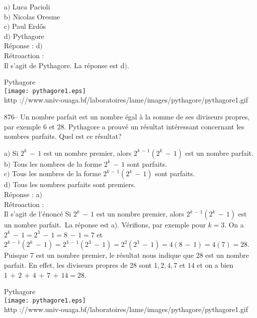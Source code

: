 ﻿\documentclass[letterpaper, 12pt]{article}
\begin{document}
a$)$ Luca Pacioli \\
b$)$ Nicolas Oresme \\
c$)$ Paul Erd\H{o}s \\
d$)$ Pythagore \\

R\'eponse : d$)$\\

R\'etroaction : \\
Il s'agit de Pythagore. La r\'eponse est d$)$.\\

        \begin{center}
        Pythagore\\
    \texttt{[image: pythagore1.eps]}\\
        {\footnotesize http
://www.univ-ouaga.bf/laboratoires/lame/images/pythagore/pythagore1.gif}
    \end{center}

876-- Un nombre parfait est un nombre \'egal \`a la somme de ses
diviseurs propres, par exemple 6 et 28. Pythagore a prouv\'e un
r\'esultat int\'eressant concernant les nombres parfaits. Quel est
ce r\'esultat?

a$)$ Si $2^k\,-\,1$ est un nombre premier, alors $2^{k\,-\,1}(2^k\,-\,1)$
est un nombre parfait. \\
b$)$ Tous les nombres de la forme $2^k\,-\,1$ sont parfaits. \\
c$)$ Tous les nombres de la forme $2^{k\,-\,1}(2^k\,-\,1)$ sont parfaits. \\
d$)$ Tous les nombres parfaits sont premiers.\\

R\'eponse : a$)$\\

R\'etroaction : \\
Il s'agit de l'\'enonc\'e \og Si $2^k\,-\,1$ est un nombre premier,
alors $2^{k\,-\,1}(2^k\,-\,1)$ est un nombre parfait.\fg\ La
r\'eponse est a). V\'erifions, par exemple pour $k=3$. On a
$2^k\,-\,1=2^3\,-\,1=8\,-\,1=7$ et
$2^{k\,-\,1}(2^k\,-\,1)=2^{3\,-\,1}(2^3\,-\,1)=2^2(2^3\,-\,1)=4(8\,-\,1)=4(7)=28$.
Puisque 7 est un nombre premier, le r\'esultat nous indique que 28
est un nombre parfait. En effet, les diviseurs propres de 28 sont
$1,2,4,7$ et $14$ et on a bien
$1\,+\,2\,+\,4\,+\,7\,+\,14=28$.\\

        \begin{center}
        Pythagore\\
    \texttt{[image: pythagore1.eps]}\\
        {\footnotesize http
://www.univ-ouaga.bf/laboratoires/lame/images/pythagore/pythagore1.gif}
    \end{center}
\end{document}

